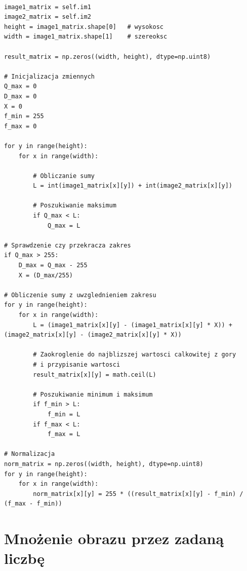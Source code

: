 \documentclass[final,a4paper,openany,12pt]{mwbk}
\begin{document}
\begin{lstlisting}[caption=Sumowanie obrazów szarych]

image1_matrix = self.im1
image2_matrix = self.im2
height = image1_matrix.shape[0]   # wysokosc
width = image1_matrix.shape[1]    # szereoksc

result_matrix = np.zeros((width, height), dtype=np.uint8)

# Inicjalizacja zmiennych
Q_max = 0
D_max = 0
X = 0
f_min = 255
f_max = 0

for y in range(height):
    for x in range(width):  

        # Obliczanie sumy
        L = int(image1_matrix[x][y]) + int(image2_matrix[x][y])

        # Poszukiwanie maksimum
        if Q_max < L:
            Q_max = L

# Sprawdzenie czy przekracza zakres
if Q_max > 255:
    D_max = Q_max - 255
    X = (D_max/255)

# Obliczenie sumy z uwzglednieniem zakresu
for y in range(height):
    for x in range(width): 
        L = (image1_matrix[x][y] - (image1_matrix[x][y] * X)) + (image2_matrix[x][y] - (image2_matrix[x][y] * X))

        # Zaokroglenie do najblizszej wartosci calkowitej z gory
        # i przypisanie wartosci
        result_matrix[x][y] = math.ceil(L)
        
        # Poszukiwanie minimum i maksimum
        if f_min > L:
            f_min = L
        if f_max < L:
            f_max = L

# Normalizacja
norm_matrix = np.zeros((width, height), dtype=np.uint8)
for y in range(height):
    for x in range(width):
        norm_matrix[x][y] = 255 * ((result_matrix[x][y] - f_min) / (f_max - f_min))

\end{lstlisting}

\section {Mnożenie obrazu przez zadaną liczbę}
\hfill
\\\\
\indent
\end{document}
